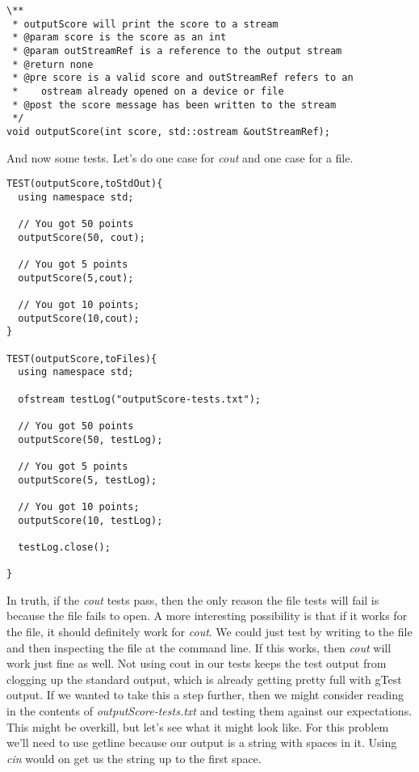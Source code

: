 \documentclass[]{tufte-handout}
\begin{document}
\begin{verbatim}
\**
 * outputScore will print the score to a stream
 * @param score is the score as an int
 * @param outStreamRef is a reference to the output stream
 * @return none
 * @pre score is a valid score and outStreamRef refers to an
 *    ostream already opened on a device or file
 * @post the score message has been written to the stream
 */
void outputScore(int score, std::ostream &outStreamRef);
\end{verbatim}

And now some tests. Let's do one case for \textit{cout} and one case for a file.

\begin{verbatim}
TEST(outputScore,toStdOut){
  using namespace std;

  // You got 50 points
  outputScore(50, cout);
  
  // You got 5 points
  outputScore(5,cout);

  // You got 10 points;
  outputScore(10,cout);
}

TEST(outputScore,toFiles){
  using namespace std; 
  
  ofstream testLog("outputScore-tests.txt");
  
  // You got 50 points
  outputScore(50, testLog);
  
  // You got 5 points
  outputScore(5, testLog);

  // You got 10 points;
  outputScore(10, testLog);
  
  testLog.close();	 
  
}
\end{verbatim}

In truth, if the \textit{cout} tests pass, then the only reason the file tests will fail is because the file fails to open.   A more interesting possibility is that if it works for the file, it should definitely work for \textit{cout}. We could just test by writing to the file and then inspecting the file at the command line.  If this works, then \textit{cout} will work just fine as well. Not using cout in our tests keeps the test output from clogging up the standard output, which is already getting pretty full with gTest output. If we wanted to take this a step further, then we might consider reading in the contents of \textit{outputScore-tests.txt} and testing them against our expectations.  This might be overkill, but let's see what it might look like. For this problem we'll need to use getline because our output is a string with spaces in it. Using \textit{cin} would on get us the string up to the first space.
\end{document}
